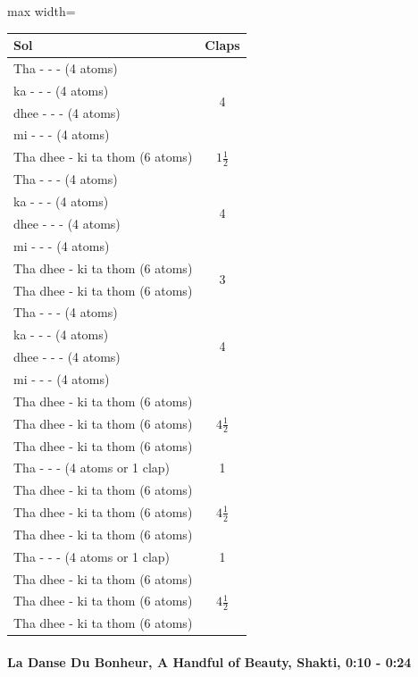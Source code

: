 \begin{center}
\begin{adjustbox}{max width=\textwidth}
\begin{tabular}{l c}
\toprule
Sol & Claps\\
\midrule
Tha - - - (4 atoms)  & \multirow{4}{*}{4}\\
ka - - - (4 atoms)   & \\
dhee - - - (4 atoms) & \\
mi - - - (4 atoms)   & \\
\midrule
Tha dhee - ki ta thom (6 atoms) & $1\frac{1}{2}$\\
\midrule
Tha - - - (4 atoms)  & \multirow{4}{*}{4}\\
ka - - - (4 atoms)   & \\
dhee - - - (4 atoms) & \\
mi - - - (4 atoms)   & \\
\midrule
Tha dhee - ki ta thom (6 atoms) & \multirow{2}{*}{3}\\
Tha dhee - ki ta thom (6 atoms) & \\
\midrule
Tha - - - (4 atoms)  & \multirow{4}{*}{4}\\
ka - - - (4 atoms)   & \\
dhee - - - (4 atoms) & \\
mi - - - (4 atoms)   & \\
\midrule
Tha dhee - ki ta thom (6 atoms) & \multirow{3}{*}{$4\frac{1}{2}$}\\
Tha dhee - ki ta thom (6 atoms) & \\
Tha dhee - ki ta thom (6 atoms) & \\
Tha - - - (4 atoms or 1 clap)   & 1\\
\midrule
Tha dhee - ki ta thom (6 atoms) & \multirow{3}{*}{$4\frac{1}{2}$}\\
Tha dhee - ki ta thom (6 atoms) & \\
Tha dhee - ki ta thom (6 atoms) & \\
Tha - - - (4 atoms or 1 clap)   & 1\\
\midrule
Tha dhee - ki ta thom (6 atoms) & \multirow{3}{*}{$4\frac{1}{2}$}\\
Tha dhee - ki ta thom (6 atoms) & \\
Tha dhee - ki ta thom (6 atoms) & \\
\bottomrule
\end{tabular}
\end{adjustbox}
\end{center}

\paragraph{La Danse Du Bonheur, A Handful of Beauty, Shakti, 0:10 - 0:24}

